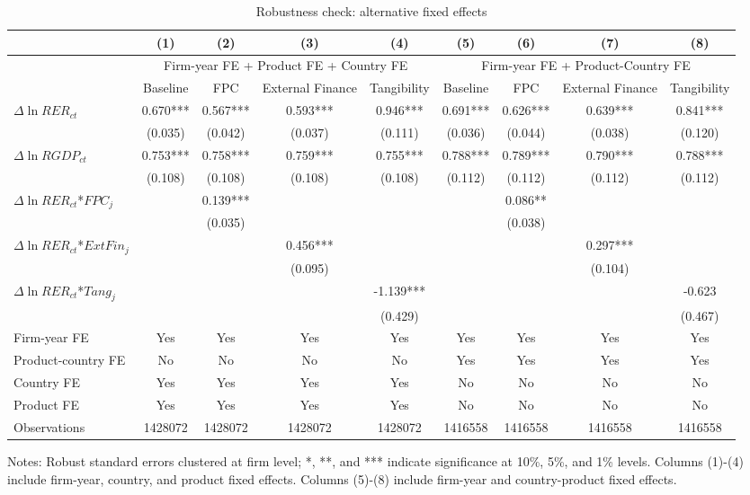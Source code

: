 \documentclass[12pt]{article}
\begin{document}
\begin{table}
	\centering
	\caption{Robustness check: alternative fixed effects}
	\begin{threeparttable}
		\begin{tabular}{lcccccccc}
			\toprule
			& (1)   & (2)   & (3)   & (4) &  (5)  &  (6)  & (7)  & (8)\\
			\midrule
			& \multicolumn{4}{c}{Firm-year FE + Product FE + Country FE} & \multicolumn{4}{c}{Firm-year FE + Product-Country FE}\\
			& Baseline & FPC   & External Finance & Tangibility & Baseline & FPC & External Finance & Tangibility\\
			\midrule
			$\Delta \ln RER_{ct}$ & 0.670*** & 0.567*** & 0.593*** & 0.946*** & 0.691*** & 0.626*** & 0.639*** & 0.841*** \\
                & (0.035) & (0.042) & (0.037) & (0.111) & (0.036) & (0.044) & (0.038) & (0.120) \\
			$\Delta \ln RGDP_{ct}$ & 0.753*** & 0.758*** & 0.759*** & 0.755*** & 0.788*** & 0.789*** & 0.790*** & 0.788*** \\
			& (0.108) & (0.108) & (0.108) & (0.108) & (0.112) & (0.112) & (0.112) & (0.112) \\
			$\Delta \ln RER_{ct}$*$FPC_{j}$ &  & 0.139*** &       &       &       & 0.086** &       &  \\
			&  & (0.035) &       &       &       & (0.038) &       &  \\
			$\Delta \ln RER_{ct}$*$ExtFin_{j}$ &   &       & 0.456*** &       &       &       & 0.297*** &  \\
			&  &       & (0.095) &       &       &       & (0.104) &  \\
			$\Delta \ln RER_{ct}$*$Tang_{j}$ &   &       &       & -1.139*** &       &       &       & -0.623 \\
			&   &       &       & (0.429) &       &       &       & (0.467) \\
			Firm-year FE  &  Yes   & Yes   & Yes & Yes & Yes & Yes & Yes & Yes\\
			Product-country FE & No & No & No & No & Yes & Yes & Yes & Yes\\
			Country FE &  Yes   & Yes   & Yes   & Yes & No & No & No & No\\
			Product FE &  Yes   & Yes   & Yes   & Yes & No & No & No & No\\
			Observations & 1428072 & 1428072 & 1428072 & 1428072 & 1416558 & 1416558 & 1416558 & 1416558 \\
			\bottomrule
		\end{tabular}
		\begin{tablenotes}
			\footnotesize
			\item[Notes:] Robust standard errors clustered at firm level; *, **, and *** indicate significance at 10\%, 5\%, and 1\% levels. Columns (1)-(4) include firm-year, country, and product fixed effects.  Columns (5)-(8) include firm-year and country-product fixed effects.
		\end{tablenotes}
	\end{threeparttable}
	\label{tab.robust.fe}
\end{table}
\end{document}
